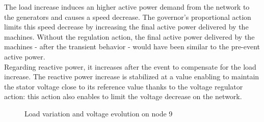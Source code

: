 \documentclass[a4paper, 12pt]{report}
\begin{document}
The load increase induces an higher active power demand from the network to the generators and causes a speed decrease. The governor's proportional action limits this speed decrease by increasing the final active power delivered by the machines. Without the regulation action, the final active power delivered by the machines - after the transient behavior - would have been similar to the pre-event active power. \\

Regarding reactive power, it increases after the event to compensate for the load increase. The reactive power increase is stabilized at a value enabling to maintain the stator voltage close to its reference value thanks to the voltage regulator action: this action also enables to limit the voltage decrease on the network.

\begin{figure}[H]
\caption{Load variation and voltage evolution on node 9}
\end{figure}
\end{document}
